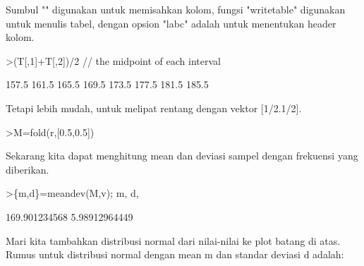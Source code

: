 \documentclass[a4paper,10pt]{article}
\begin{document}
\begin{eulernotebook}
\begin{eulercomment}
\begin{eulercomment}
\begin{eulercomment}
\begin{eulercomment}
\begin{eulercomment}
\begin{eulercomment}
\begin{eulercomment}
\begin{eulercomment}
\begin{eulercomment}
\begin{eulercomment}
\begin{eulercomment}
\begin{eulercomment}
\begin{eulercomment}
\begin{eulercomment}
\begin{eulercomment}
\begin{eulercomment}
\begin{eulercomment}
\begin{eulercomment}
\begin{eulercomment}
Sumbul "\textbar{}" digunakan untuk memisahkan kolom, fungsi "writetable"
digunakan untuk menulis tabel, dengan opsion "labc" adalah untuk
menentukan header kolom.
\end{eulercomment}
\begin{eulerprompt}
>(T[,1]+T[,2])/2 // the midpoint of each interval
\end{eulerprompt}
\begin{euleroutput}
          157.5 
          161.5 
          165.5 
          169.5 
          173.5 
          177.5 
          181.5 
          185.5 
\end{euleroutput}
\begin{eulercomment}
Tetapi lebih mudah, untuk melipat rentang dengan vektor [1/2.1/2].
\end{eulercomment}
\begin{eulerprompt}
>M=fold(r,[0.5,0.5])
\end{eulerprompt}
\begin{euleroutput}
  [157.5,  161.5,  165.5,  169.5,  173.5,  177.5,  181.5,  185.5]
\end{euleroutput}
\begin{eulercomment}
Sekarang kita dapat menghitung mean dan deviasi sampel dengan
frekuensi yang diberikan.
\end{eulercomment}
\begin{eulerprompt}
>\{m,d\}=meandev(M,v); m, d,
\end{eulerprompt}
\begin{euleroutput}
  169.901234568
  5.98912964449
\end{euleroutput}
\begin{eulercomment}
Mari kita tambahkan distribusi normal dari nilai-nilai ke plot batang
di atas. Rumus untuk distribusi normal dengan mean m dan standar
deviasi d adalah:


\end{eulercomment}
\end{eulercomment}
\end{eulercomment}
\end{eulercomment}
\end{eulercomment}
\end{eulercomment}
\end{eulercomment}
\end{eulercomment}
\end{eulercomment}
\end{eulercomment}
\end{eulercomment}
\end{eulercomment}
\end{eulercomment}
\end{eulercomment}
\end{eulercomment}
\end{eulercomment}
\end{eulercomment}
\end{eulercomment}
\end{eulercomment}
\end{eulernotebook}
\end{document}
